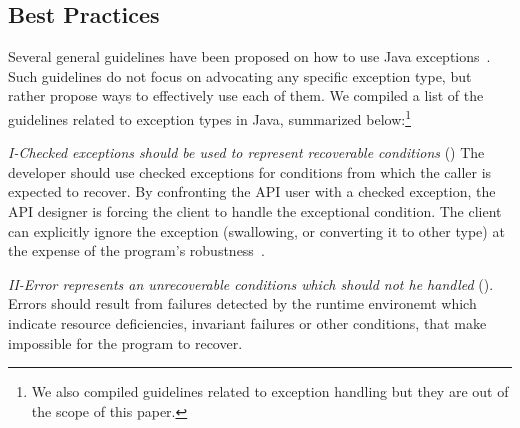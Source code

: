 \documentclass[conference]{IEEEtran}
\begin{document}


\subsection{Best Practices}
\label{sec:best}

Several general guidelines have been proposed on how to use Java
exceptions~\cite{mandrioli1992advances,gosling2000java,wirfs2006toward,
bloch2008effective}. Such guidelines do not focus on 
advocating any specific exception type, but rather propose ways to effectively use each of them.
 We compiled a list of the guidelines related to exception types in Java, 
summarized below:\footnote{We also compiled guidelines related
to exception handling but they are out of the scope of this paper.}


\emph{I-Checked exceptions should be used to represent recoverable
conditions} (\cite{mandrioli1992advances,gosling2000java,wirfs2006toward,bloch2008effective})
The developer should use checked exceptions for conditions from which the caller
is expected to recover. By confronting the API user with a checked exception,
the API designer is forcing the client to handle the exceptional condition. The
client can explicitly ignore the exception (swallowing, or converting it to
other type) at the expense of the program's robustness~\cite{gosling2000java}.

\emph{II-Error represents an unrecoverable conditions which should not he handled} 
(\cite{gosling2000java}).  Errors should result from failures detected
by the runtime environemt which indicate resource deficiencies, invariant
failures or other conditions, that make impossible for the program to recover.
\end{document}
